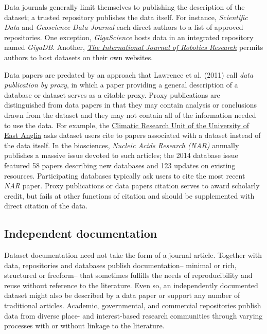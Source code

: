 \documentclass[10pt,a4paper,twocolumn]{article}
\begin{document}
{{Data journals generally limit themselves to publishing the description of the dataset; a trusted repository publishes the data itself.
For instance, \emph{Scientific Data} and \emph{Geoscience Data Journal} each direct authors to a list of approved repositories.
One exception, \emph{GigaScience} hosts data in an integrated repository named \emph{GigaDB}.
Another, \href{http://www.ijrr.org/}{\emph{The International Journal of Robotics Research}}\cite{newman_data_2009} permits authors to host datasets on their own websites.

Data papers are predated by an approach that Lawrence et al. (2011) call \emph{data publication by proxy}, in which a paper providing a general description of a database or dataset serves as a citable proxy\cite{lawrence_citation_2011}.
Proxy publications are distinguished from data papers in that they may contain analysis or conclusions drawn from the dataset and they may not contain all of the information needed to use the data.
For example, the \href{http://www.cru.uea.ac.uk/}{Climatic Research Unit of the University of East Anglia} asks dataset users cite to papers associated with a dataset instead of the data itself.
In the biosciences, \emph{Nucleic Acids Research (NAR)} annually publishes a massive issue devoted to such articles; the 2014 database issue featured 58 papers describing new databases and 123 updates on existing resources\cite{fernandez-suarez_2014_2014}.
Participating databases typically ask users to cite the most recent \emph{NAR} paper.
Proxy publications or data papers citation serves to award scholarly credit, but fails at other functions of citation and should be supplemented with direct citation of the data.

\subsection*{Independent documentation}\label{independent-documentation}

Dataset documentation need not take the form of a journal article.
Together with data, repositories and databases publish documentation-- minimal or rich, structured or freeform-- that sometimes fulfills the needs of reproducibility and reuse without reference to the literature.
Even so, an independently documented dataset might also be described by a data paper or support any number of traditional articles.
Academic, governmental, and commercial repositories publish data from diverse place- and interest-based research communities through varying processes with or without linkage to the literature.

}}
\end{document}
